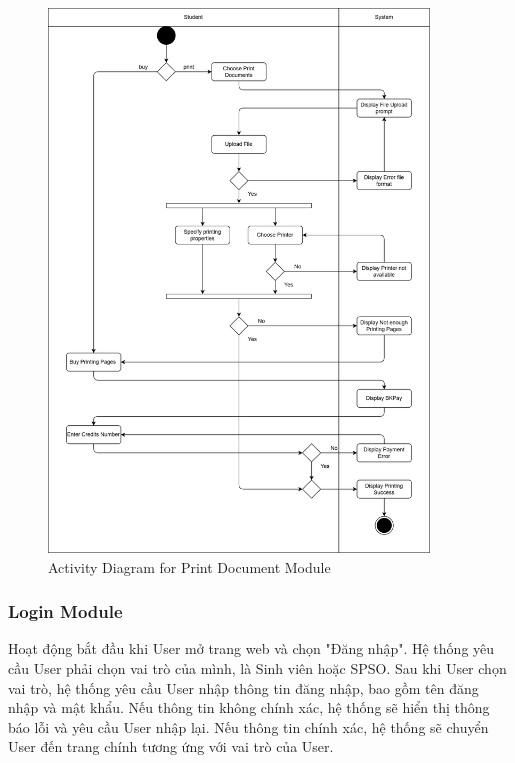 \begin{figure}[htbp]
    \centering
    \includegraphics[width=0.9\textwidth]{Images/Activity/Print_activity.png}
    \caption{Activity Diagram for Print Document Module}
\end{figure}

\newpage
\subsubsection{Login Module}
Hoạt động bắt đầu khi User mở trang web và chọn "Đăng nhập". Hệ thống yêu cầu User phải chọn vai trò của mình, là Sinh viên hoặc SPSO. Sau khi User chọn vai trò, hệ thống yêu cầu User nhập thông tin đăng nhập, bao gồm tên đăng nhập và mật khẩu. Nếu thông tin không chính xác, hệ thống sẽ hiển thị thông báo lỗi và yêu cầu User nhập lại. Nếu thông tin chính xác, hệ thống sẽ chuyển User đến trang chính tương ứng với vai trò của User.

